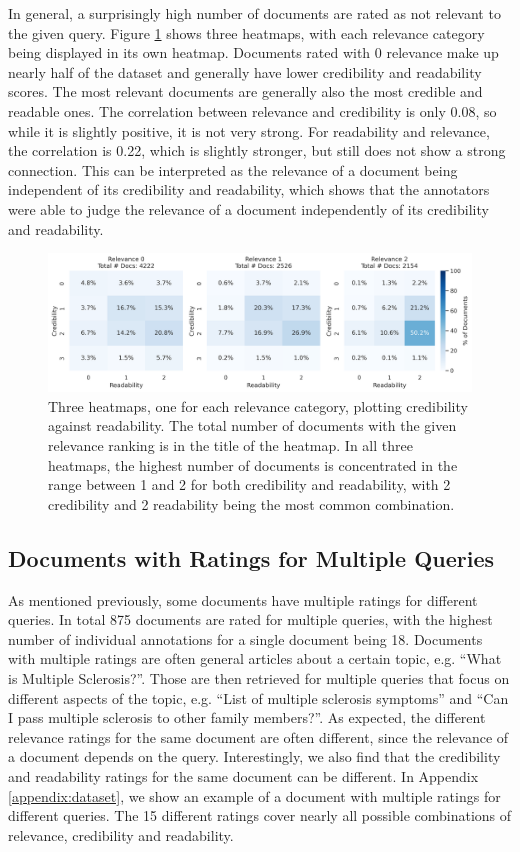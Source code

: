 In general, a surprisingly high number of documents are rated as not relevant to the given query.
Figure \ref{fig:heatmap_rel_cred_read} shows three heatmaps, with each relevance category being displayed in its own heatmap.
Documents rated with 0 relevance make up nearly half of the dataset and generally have lower credibility and readability scores.
The most relevant documents are generally also the most credible and readable ones.
The correlation between relevance and credibility is only 0.08, so while it is slightly positive, it is not very strong.
For readability and relevance, the correlation is 0.22, which is slightly stronger, but still does not show a strong connection.
This can be interpreted as the relevance of a document being independent of its credibility and readability, which shows that the annotators were able to judge the relevance of a document independently of its credibility and readability.
\begin{figure}
\centering
\includegraphics[width=\textwidth]{images/heatmap_qrels.png}
\caption{Three heatmaps, one for each relevance category, plotting credibility against readability.
The total number of documents with the given relevance ranking is in the title of the heatmap.
In all three heatmaps, the highest number of documents is concentrated in the range between 1 and 2 for both credibility and readability, with 2 credibility and 2 readability being the most common combination.
}
\label{fig:heatmap_rel_cred_read}
\end{figure}

\subsection{Documents with Ratings for Multiple Queries}
As mentioned previously, some documents have multiple ratings for different queries.
In total 875 documents are rated for multiple queries, with the highest number of individual annotations for a single document being 18.
Documents with multiple ratings are often general articles about a certain topic, e.g. ``What is Multiple Sclerosis?''.
Those are then retrieved for multiple queries that focus on different aspects of the topic, e.g. ``List of multiple sclerosis symptoms'' and ``Can I pass multiple sclerosis to other family members?''.
As expected, the different relevance ratings for the same document are often different, since the relevance of a document depends on the query.
Interestingly, we also find that the credibility and readability ratings for the same document can be different.
In Appendix \ref{appendix:dataset}, we show an example of a document with multiple ratings for different queries.
The 15 different ratings cover nearly all possible combinations of relevance, credibility and readability.

